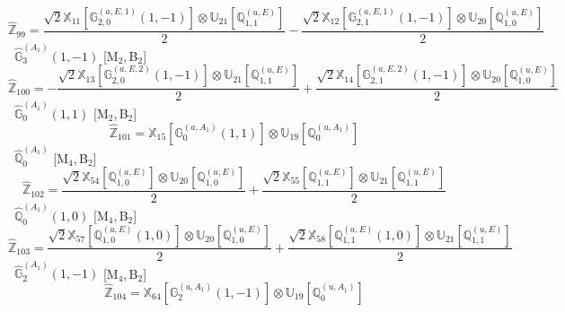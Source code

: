 \documentclass[fleqn,10pt,landscape]{article}
\begin{document}
\begin{itemize}
\begin{dmath*}
\hat{\mathbb{Z}}_{99}=\frac{\sqrt{2} \mathbb{X}_{11}[\mathbb{G}_{2,0}^{(a,E,1)}(1,-1)] \otimes\mathbb{U}_{21}[\mathbb{Q}_{1,1}^{(u,E)}]}{2} - \frac{\sqrt{2} \mathbb{X}_{12}[\mathbb{G}_{2,1}^{(a,E,1)}(1,-1)] \otimes\mathbb{U}_{20}[\mathbb{Q}_{1,0}^{(u,E)}]}{2}
\end{dmath*}
\vspace{4mm}
\noindent {} $\,\,\,\hat{\mathbb{G}}_{3}^{(A_{1})}(1,-1)$ [M$_{2}$,\,B$_{2}$]
\begin{dmath*}
\hat{\mathbb{Z}}_{100}=- \frac{\sqrt{2} \mathbb{X}_{13}[\mathbb{G}_{2,0}^{(a,E,2)}(1,-1)] \otimes\mathbb{U}_{21}[\mathbb{Q}_{1,1}^{(u,E)}]}{2} + \frac{\sqrt{2} \mathbb{X}_{14}[\mathbb{G}_{2,1}^{(a,E,2)}(1,-1)] \otimes\mathbb{U}_{20}[\mathbb{Q}_{1,0}^{(u,E)}]}{2}
\end{dmath*}
\vspace{4mm}
\noindent {} $\,\,\,\hat{\mathbb{G}}_{0}^{(A_{1})}(1,1)$ [M$_{2}$,\,B$_{2}$]
\begin{dmath*}
\hat{\mathbb{Z}}_{101}=\mathbb{X}_{15}[\mathbb{G}_{0}^{(a,A_{1})}(1,1)] \otimes\mathbb{U}_{19}[\mathbb{Q}_{0}^{(u,A_{1})}]
\end{dmath*}
\vspace{4mm}
\noindent {} $\,\,\,\hat{\mathbb{Q}}_{0}^{(A_{1})}$ [M$_{4}$,\,B$_{2}$]
\begin{dmath*}
\hat{\mathbb{Z}}_{102}=\frac{\sqrt{2} \mathbb{X}_{54}[\mathbb{Q}_{1,0}^{(a,E)}] \otimes\mathbb{U}_{20}[\mathbb{Q}_{1,0}^{(u,E)}]}{2} + \frac{\sqrt{2} \mathbb{X}_{55}[\mathbb{Q}_{1,1}^{(a,E)}] \otimes\mathbb{U}_{21}[\mathbb{Q}_{1,1}^{(u,E)}]}{2}
\end{dmath*}
\vspace{4mm}
\noindent {} $\,\,\,\hat{\mathbb{Q}}_{0}^{(A_{1})}(1,0)$ [M$_{4}$,\,B$_{2}$]
\begin{dmath*}
\hat{\mathbb{Z}}_{103}=\frac{\sqrt{2} \mathbb{X}_{57}[\mathbb{Q}_{1,0}^{(a,E)}(1,0)] \otimes\mathbb{U}_{20}[\mathbb{Q}_{1,0}^{(u,E)}]}{2} + \frac{\sqrt{2} \mathbb{X}_{58}[\mathbb{Q}_{1,1}^{(a,E)}(1,0)] \otimes\mathbb{U}_{21}[\mathbb{Q}_{1,1}^{(u,E)}]}{2}
\end{dmath*}
\vspace{4mm}
\noindent {} $\,\,\,\hat{\mathbb{G}}_{2}^{(A_{1})}(1,-1)$ [M$_{4}$,\,B$_{2}$]
\begin{dmath*}
\hat{\mathbb{Z}}_{104}=\mathbb{X}_{64}[\mathbb{G}_{2}^{(a,A_{1})}(1,-1)] \otimes\mathbb{U}_{19}[\mathbb{Q}_{0}^{(u,A_{1})}]
\end{dmath*}
\vspace{4mm}

\end{itemize}
\end{document}
